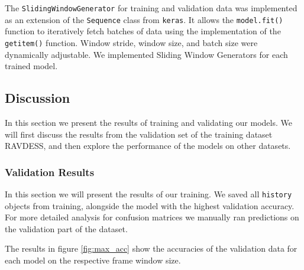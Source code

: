 The \texttt{SlidingWindowGenerator} for training and validation data was implemented as an extension of the \texttt{Sequence} class from \texttt{keras}. It allows the \texttt{model.fit()} function to iteratively fetch batches of data using the implementation of the \texttt{\textunderscore\textunderscore getitem\textunderscore\textunderscore()} function. Window stride, window size, and batch size were dynamically adjustable. We implemented Sliding Window Generators for each trained model.

\subsection{Discussion}
In this section we present the results of training and validating our models. We will first discuss the results from the validation set of the training dataset RAVDESS, and then explore the performance of the models on other datasets.
\subsubsection{Validation Results}
\label{sec:model_results}
In this section we will present the results of our training. We saved all \texttt{history} objects from training, alongside the model with the highest validation accuracy. For more detailed analysis for confusion matrices we manually ran predictions on the validation part of the dataset. 

The results in figure \ref{fig:max_acc} show the accuracies of the validation data for each model on the respective frame window size. 

